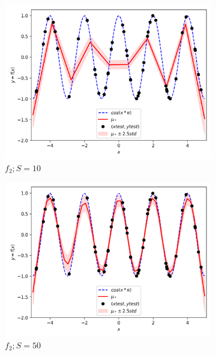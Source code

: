 \documentclass{article}
\begin{document}
\begin{figure}
\begin{subfigure}{.33\textwidth}
    \includegraphics[width=\linewidth]{test_size/func2_10.png}
    \caption{$f_2; S = 10$}
  \end{subfigure}
  \begin{subfigure}{.33\textwidth}
    \centering
    \includegraphics[width=\linewidth]{test_size/func2_50.png}
    \caption{$f_2; S = 50$}
  \end{subfigure}
  \begin{subfigure}{.33\textwidth}
    \centering

\end{subfigure}
\end{figure}
\end{document}
